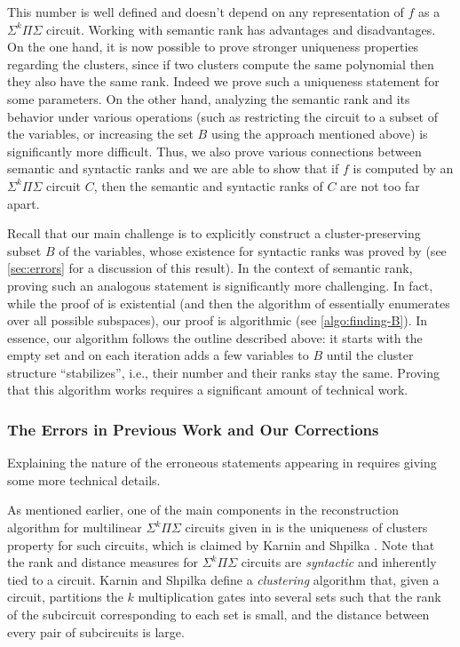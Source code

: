 \documentclass[12pt]{article}
\newcommand{\Sps}[1]{\Sigma^{#1} \Pi\Sigma}
\begin{document}
	This number is well defined and doesn't depend on any representation of $f$ as a $\Sps{k}$ circuit. Working with semantic rank has advantages and disadvantages. On the one hand, it is now possible to prove stronger uniqueness properties regarding the clusters, since if two clusters compute the same polynomial then they also have the same rank. Indeed we prove such a uniqueness statement for some parameters. On the other hand, analyzing the semantic rank and its behavior under various operations (such as restricting the circuit to a subset of the variables, or increasing the set $B$ using the approach mentioned above) is significantly more difficult. Thus, we also prove various connections between semantic and syntactic ranks and we are able to show that if $f$ is computed by an $\Sps{k}$ circuit $C$, then the semantic and syntactic ranks of $C$ are not too far apart. 
	
	Recall that our main challenge is to explicitly construct a cluster-preserving subset $B$ of the variables, whose existence for syntactic ranks was proved by \cite{KarninShpilka09} (see \autoref{sec:errors} for a discussion of this result). In the context of semantic rank, proving such an analogous statement is significantly more challenging. In fact, while the proof of \cite{KarninShpilka09} is existential (and then the algorithm of \cite{BSV21} essentially enumerates over all possible subspaces), our proof is algorithmic (see \autoref{algo:finding-B}).
	In essence, our algorithm follows the outline described above: it starts with the empty set and on each iteration adds a few variables to $B$ until the cluster structure ``stabilizes'', i.e., their number and their ranks stay the same. Proving that this algorithm works requires a significant amount of technical work.
	
	\subsubsection{The Errors in Previous Work and Our Corrections}
	\label{sec:errors}
	
	Explaining the nature of the erroneous statements appearing in \cite{BSV21, KarninShpilka09} requires giving some more technical details.
	
	As mentioned earlier, one of the main components in the reconstruction algorithm for multilinear $\Sps{k}$ circuits given in \cite{BSV21} is the uniqueness of clusters property for such circuits, which is claimed by Karnin and Shpilka \cite{KarninShpilka09}. Note that the rank and distance measures for $\Sps{k}$ circuits are \emph{syntactic} and inherently tied to a circuit. Karnin and Shpilka \cite{KarninShpilka09} define a \emph{clustering} algorithm that, given a circuit, partitions the $k$ multiplication gates into several sets such that the rank of the subcircuit corresponding to each set is small, and the distance between every pair of subcircuits is large.
	
\end{document}
